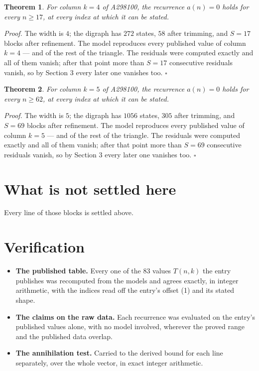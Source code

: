 \documentclass[11pt]{article}
\newtheorem{theorem}{Theorem}
\theoremstyle{definition}
\begin{document}
\begin{theorem} For column $k = 4$ of A298100, the recurrence $a(n) = 0$ holds for every $n \ge 17$, at every index at which it can be stated.\end{theorem}

{\itshape Proof.} The width is $4$; the digraph has $272$ states, $58$ after trimming, and $S = 17$ blocks after refinement. The model reproduces every published value of column $k = 4$ --- and of the rest of the triangle. The residuals were computed exactly and all of them vanish; after that point more than $S = 17$ consecutive residuals vanish, so by Section 3 every later one vanishes too. $\square$

\begin{theorem} For column $k = 5$ of A298100, the recurrence $a(n) = 0$ holds for every $n \ge 62$, at every index at which it can be stated.\end{theorem}

{\itshape Proof.} The width is $5$; the digraph has $1056$ states, $305$ after trimming, and $S = 69$ blocks after refinement. The model reproduces every published value of column $k = 5$ --- and of the rest of the triangle. The residuals were computed exactly and all of them vanish; after that point more than $S = 69$ consecutive residuals vanish, so by Section 3 every later one vanishes too. $\square$

\section{What is not settled here}

Every line of those blocks is settled above.

\section{Verification}

\begin{itemize}

\item {\bfseries The published table.} Every one of the 83 values $T(n,k)$ the entry publishes was recomputed from the models and agrees exactly, in integer arithmetic, with the indices read off the entry's offset (1) and its stated shape.

\item {\bfseries The claims on the raw data.} Each recurrence was evaluated on the entry's published values alone, with no model involved, wherever the proved range and the published data overlap.

\item {\bfseries The annihilation test.} Carried to the derived bound for each line separately, over the whole vector, in exact integer arithmetic.

\end{itemize}
\end{document}
